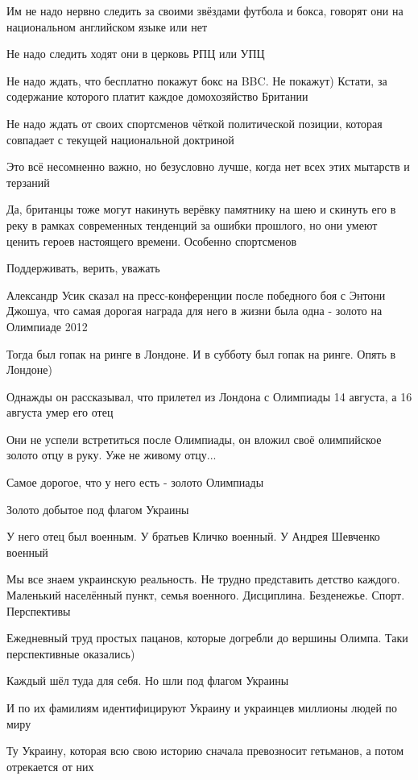 Им не надо нервно следить за своими звёздами футбола и бокса, говорят они на
национальном английском языке или нет 

Не надо следить ходят они в церковь РПЦ или УПЦ

Не надо ждать, что бесплатно покажут бокс на BBC. Не покажут) Кстати, за
содержание которого платит каждое домохозяйство Британии

Не надо ждать от своих спортсменов чёткой политической позиции, которая
совпадает с текущей национальной доктриной

Это всё несомненно важно, но безусловно лучше, когда нет всех этих мытарств и
терзаний

Да, британцы тоже могут накинуть верёвку памятнику на шею и скинуть его в реку
в рамках современных тенденций за ошибки прошлого, но они умеют ценить героев
настоящего времени. Особенно спортсменов 

Поддерживать, верить, уважать 

Александр Усик сказал на пресс-конференции после победного боя с Энтони Джошуа,
что самая дорогая награда для него в жизни была одна - золото на Олимпиаде 2012

Тогда был гопак на ринге в Лондоне. И в субботу был гопак на ринге. Опять в
Лондоне) 

Однажды он рассказывал, что прилетел из Лондона с Олимпиады 14 августа, а 16
августа умер его отец

Они не успели встретиться после Олимпиады, он вложил своё олимпийское золото
отцу в руку. Уже не живому отцу...

Самое дорогое, что у него есть - золото Олимпиады 

Золото добытое под флагом Украины 

У него отец был военным. У братьев Кличко военный. У Андрея Шевченко военный

Мы все знаем украинскую реальность. Не трудно представить детство каждого.
Маленький населённый пункт, семья военного. Дисциплина. Безденежье. Спорт.
Перспективы 

Ежедневный труд простых пацанов, которые догребли до вершины Олимпа. Таки
перспективные оказались) 

Каждый шёл туда для себя. Но шли под флагом Украины 

И по их фамилиям идентифицируют Украину и украинцев миллионы людей по миру 

Ту Украину, которая всю свою историю сначала превозносит гетьманов, а потом
отрекается от них 

